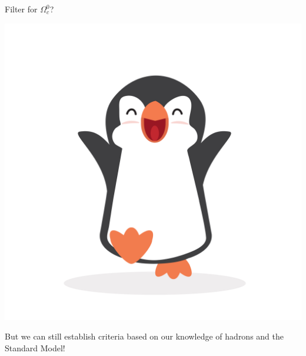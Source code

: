 \begin{frame}{Filter for $\Omega_c^0$?}
\begin{minipage}[c]{0.2\textwidth}
    \includegraphics[width=\textwidth]{Figures Lecture on Datanalysis/happy-penguin2.jpeg}
\end{minipage}%
\begin{minipage}[c]{0.75\textwidth}
     But we can still establish criteria based on our knowledge of hadrons and the Standard Model!
\end{minipage}

\end{frame}%
